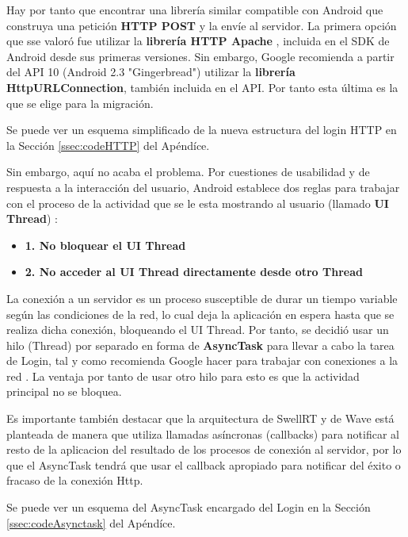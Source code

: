 	 Hay por tanto que encontrar una librería similar compatible con Android que construya una petición \textbf{HTTP POST} y la envíe al servidor. La primera opción que sse valoró fue utilizar la \textbf{librería HTTP Apache} \cite{ref:apache_http}, incluida en el SDK de Android desde sus primeras versiones. Sin embargo, Google recomienda \cite{ref:http_recommmendations} a partir del API 10 (Android 2.3 "Gingerbread") utilizar la \textbf{librería HttpURLConnection}\cite{ref:android_httpUrlConnection}, también incluida en el API. Por tanto esta última es la que se elige para la migración. 
	 
	 Se puede ver un esquema simplificado de la nueva estructura del login HTTP en la Sección \ref{ssec:codeHTTP} del Apéndíce.
	  
	 Sin embargo, aquí no acaba el problema. Por cuestiones de usabilidad y de respuesta a la interacción del usuario, Android establece dos reglas para trabajar con el proceso de la actividad que se le esta mostrando al usuario (llamado \textbf{UI Thread}) \cite{ref:android_processes}:
	  
	  \begin{itemize}
	  	\item \textbf{1. No bloquear el UI Thread}
	  	\item \textbf{2. No acceder al UI Thread directamente desde otro Thread}
	  \end{itemize}
	  
	  La conexión a un servidor es un proceso susceptible de durar un tiempo variable según las condiciones de la red, lo cual deja la aplicación en espera hasta que se realiza dicha conexión,  bloqueando el UI Thread. Por tanto, se decidió usar un hilo (Thread) por separado en forma de \textbf{AsyncTask} \cite{ref:android_asynctask} para llevar a cabo la tarea de Login, tal y como recomienda Google hacer para trabajar con conexiones a la red \cite{ref:android_networking}. La ventaja por tanto de usar otro hilo para esto es que la actividad principal no se bloquea.
	  	 
	  Es importante también destacar que la arquitectura de SwellRT y de Wave está planteada de manera que utiliza llamadas asíncronas (callbacks) para notificar al resto de la aplicacion del resultado de los procesos de conexión al servidor, por lo que el AsyncTask tendrá que usar el callback apropiado para notificar del éxito o fracaso de la conexión Http.
	 
	  Se puede ver un esquema del AsyncTask encargado del Login en la Sección \ref{ssec:codeAsynctask} del Apéndíce.
	    
